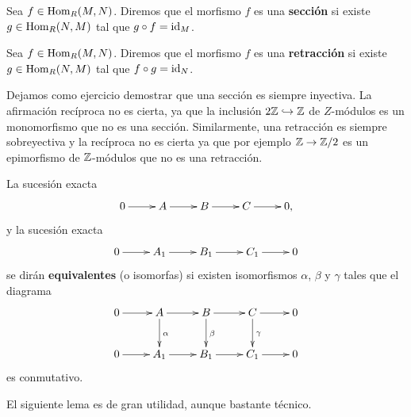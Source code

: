 \begin{definition}
Sea $f\in\operatorname{Hom}_R(M,N)$. Diremos que el morfismo $f$ es una \textbf{sección} si existe $g\in\operatorname{Hom}_R(N,M)$ tal que $g\circ f=\operatorname{id}_M$.  
\end{definition}

\begin{definition}
Sea $f\in\operatorname{Hom}_R(M,N)$. Diremos que el morfismo $f$ es una \textbf{retracción} si existe $g\in\operatorname{Hom}_R(N,M)$ tal que $f\circ g=\operatorname{id}_N$. 
\end{definition}

Dejamos como ejercicio demostrar que una sección es siempre inyectiva. La afirmación recíproca no es cierta, ya que 
la inclusión $2\mathbb{Z}\hookrightarrow\mathbb{Z}$ de $Z$-módulos es un monomorfismo que no es una sección.  
Similarmente, una retracción es siempre sobreyectiva y la recíproca no es cierta 
ya que por ejemplo $\mathbb{Z}\to\mathbb{Z}/2$ es un epimorfismo de $\mathbb{Z}$-módulos que no es una retracción. 
 
\begin{definition}
	La sucesión exacta 
	\[  
		\xymatrix{
        0\ar[r]
        & A
        \ar[r]
        & B
        \ar[r]
        & C\ar[r]
        & 0,
        }
      \]
      y la sucesión exacta 
      \[
        \xymatrix{
        0\ar[r]
        & A_1
        \ar[r]
        & B_1
        \ar[r]
        & C_1\ar[r]
        & 0	
        }
     \]
	se dirán \textbf{equivalentes} (o isomorfas) si 
	existen isomorfismos $\alpha$, $\beta$ y $\gamma$ tales que
	el diagrama 
	    \begin{equation}
        \xymatrix{
        0\ar[r] 
        & A
        \ar@{->}[d]^{\alpha}
        \ar[r]
        & B
        \ar[r]
        \ar[d]^\beta
        & C\ar[r]
        \ar@{->}[d]^\gamma 
        & 0
        \\
        0\ar[r] 
        & A_1
        \ar[r]
        & B_1
        \ar[r]
        & C_1\ar[r]
        & 0
        }
        \end{equation} 
     es conmutativo. 
\end{definition}

El siguiente lema es de gran utilidad, aunque bastante técnico.


